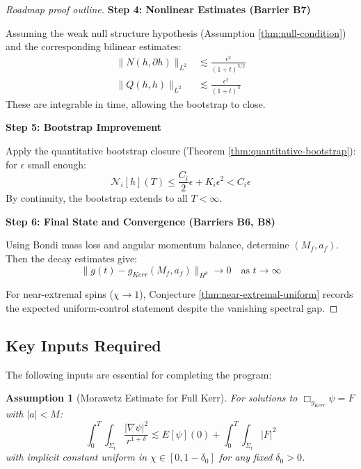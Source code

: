 \documentclass[12pt,a4paper]{article}
\newtheorem{assumption}[theorem]{Assumption}
\begin{document}
\begin{proof}[Roadmap proof outline]
\textbf{Step 4: Nonlinear Estimates (Barrier B7)}

Assuming the weak null structure hypothesis (Assumption \ref{thm:null-condition}) and the corresponding bilinear estimates:
\begin{align}
\|N(h, \partial h)\|_{L^2} &\lesssim \frac{\epsilon^2}{(1+t)^{5/2}} \\
\|Q(h, h)\|_{L^2} &\lesssim \frac{\epsilon^2}{(1+t)^3}
\end{align}
These are integrable in time, allowing the bootstrap to close.

\textbf{Step 5: Bootstrap Improvement}

Apply the quantitative bootstrap closure (Theorem \ref{thm:quantitative-bootstrap}): for $\epsilon$ small enough:
\begin{equation}
\mathcal{N}_i[h](T) \leq \frac{C_i}{2}\epsilon + K_i \epsilon^2 < C_i \epsilon
\end{equation}
By continuity, the bootstrap extends to all $T < \infty$.

\textbf{Step 6: Final State and Convergence (Barriers B6, B8)}

Using Bondi mass loss and angular momentum balance, determine $(M_f, a_f)$. Then the decay estimates give:
\begin{equation}
\|g(t) - g_{Kerr}(M_f, a_f)\|_{H^k} \to 0 \quad \text{as } t \to \infty
\end{equation}

For near-extremal spins ($\chi \to 1$), Conjecture \ref{thm:near-extremal-uniform} records the expected uniform-control statement despite the vanishing spectral gap.
\end{proof}

\subsection{Key Inputs Required}

The following inputs are essential for completing the program:

\begin{assumption}[Morawetz Estimate for Full Kerr]\label{lem:morawetz-full}
For solutions to $\Box_{g_{Kerr}} \psi = F$ with $|a| < M$:
\begin{equation}
\int_0^T \int_{\Sigma_t} \frac{|\nabla\psi|^2}{r^{1+\delta}} \lesssim E[\psi](0) + \int_0^T \int_{\Sigma_t} |F|^2
\end{equation}
with implicit constant uniform in $\chi \in [0, 1-\delta_0]$ for any fixed $\delta_0 > 0$.
\end{assumption}
\end{document}
